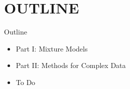 \documentclass[handout]{beamer}
\begin{document}
\section*{OUTLINE}
\begin{frame}{Outline}
\begin{itemize}
\item Part I: Mixture Models
\item Part II: Methods for Complex Data
\item To Do
\vspace*{0.3cm}
\end{itemize}
\end{frame}

\end{document}
